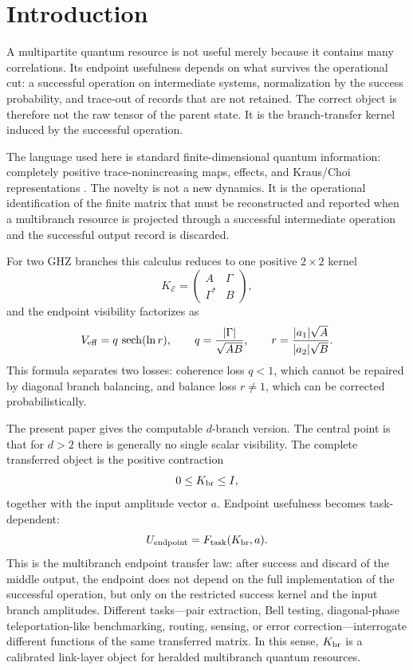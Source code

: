 \documentclass[reprint,aps,pra,superscriptaddress,nofootinbib,longbibliography]{revtex4-2}
\newcommand{\sech}{\operatorname{sech}}
\begin{document}
\section{Introduction}

A multipartite quantum resource is not useful merely because it contains many correlations.  Its endpoint usefulness depends on what survives the operational cut: a successful operation on intermediate systems, normalization by the success probability, and trace-out of records that are not retained.  The correct object is therefore not the raw tensor of the parent state.  It is the branch-transfer kernel induced by the successful operation.

The language used here is standard finite-dimensional quantum information: completely positive trace-nonincreasing maps, effects, and Kraus/Choi representations \cite{Kraus1983,Choi1975,NielsenChuang}.  The novelty is not a new dynamics.  It is the operational identification of the finite matrix that must be reconstructed and reported when a multibranch resource is projected through a successful intermediate operation and the successful output record is discarded.

For two GHZ branches this calculus reduces to one positive \(2\times2\) kernel
\[
K_{\mathcal E}=
\begin{pmatrix}
A&\Gamma\\
\Gamma^*&B
\end{pmatrix},
\]
and the endpoint visibility factorizes as
\[
V_{\rm eff}=q\,\sech(\ln r),
\qquad
q=\frac{|\Gamma|}{\sqrt{AB}},
\qquad
r=\frac{|a_1|\sqrt A}{|a_2|\sqrt B}.
\]
This formula separates two losses: coherence loss \(q<1\), which cannot be repaired by diagonal branch balancing, and balance loss \(r\ne1\), which can be corrected probabilistically.

The present paper gives the computable \(d\)-branch version.  The central point is that for \(d>2\) there is generally no single scalar visibility.  The complete transferred object is the positive contraction
\[
0\le K_{\rm br}\le I,
\]
together with the input amplitude vector \(a\).  Endpoint usefulness becomes task-dependent:
\[
U_{\rm endpoint}=F_{\rm task}(K_{\rm br},a).
\]
This is the multibranch endpoint transfer law: after success and discard of the middle output, the endpoint does not depend on the full implementation of the successful operation, but only on the restricted success kernel and the input branch amplitudes.  Different tasks---pair extraction, Bell testing, diagonal-phase teleportation-like benchmarking, routing, sensing, or error correction---interrogate different functions of the same transferred matrix.  In this sense, \(K_{\rm br}\) is a calibrated link-layer object for heralded multibranch quantum resources.
\end{document}
